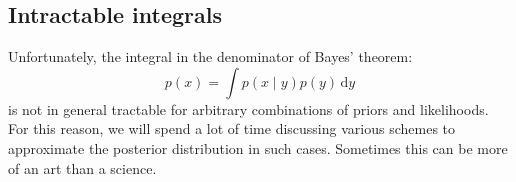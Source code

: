 \documentclass{article}
\newcommand{\given}{\mid}
\newcommand{\intd}[1]{\,\mathrm{d}{#1}}
\begin{document}
\subsection*{Intractable integrals}

Unfortunately, the integral in the denominator of Bayes' theorem:
\begin{equation*}
  p(x) = \int p(x \given y) p(y) \intd{y}
\end{equation*}
is not in general tractable for arbitrary combinations of priors and
likelihoods.  For this reason, we will spend a lot of time discussing
various schemes to approximate the posterior distribution in such
cases.  Sometimes this can be more of an art than a science.
\end{document}
